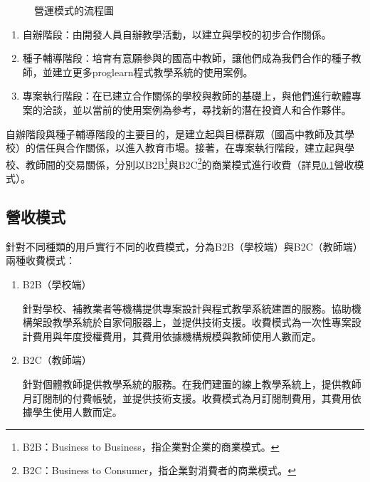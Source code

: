 \begin{figure}[h]
  \centering
  \caption{營運模式的流程圖}
\end{figure}


\begin{enumerate}
  \setlength{\parindent}{2em}
  \item 自辦階段：由開發人員自辦教學活動，以建立與學校的初步合作關係。
  \item 種子輔導階段：培育有意願參與的國高中教師，讓他們成為我們合作的種子教師，並建立更多proglearn程式教學系統的使用案例。
  \item 專案執行階段：在已建立合作關係的學校與教師的基礎上，與他們進行軟體專案的洽談，並以當前的使用案例為參考，尋找新的潛在投資人和合作夥伴。
\end{enumerate}

自辦階段與種子輔導階段的主要目的，是建立起與目標群眾（國高中教師及其學校）的信任與合作關係，以進入教育市場。接著，在專案執行階段，建立起與學校、教師間的交易關係，分別以B2B\footnote{B2B：Business to Business，指企業對企業的商業模式。}與B2C\footnote{B2C：Business to Consumer，指企業對消費者的商業模式。}的商業模式進行收費（詳見\ref{sec:revenue}營收模式）。

\subsection{營收模式} %
\label{sec:revenue}
針對不同種類的用戶實行不同的收費模式，分為B2B（學校端）與B2C（教師端）兩種收費模式：

\begin{enumerate}
  \setlength{\parindent}{2em}
  \item B2B（學校端）
  \par 針對學校、補教業者等機構提供專案設計與程式教學系統建置的服務。協助機構架設教學系統於自家伺服器上，並提供技術支援。收費模式為一次性專案設計費用與年度授權費用，其費用依據機構規模與教師使用人數而定。
  \item B2C（教師端）
  \par 針對個體教師提供教學系統的服務。在我們建置的線上教學系統上，提供教師月訂閱制的付費帳號，並提供技術支援。收費模式為月訂閱制費用，其費用依據學生使用人數而定。
\end{enumerate}